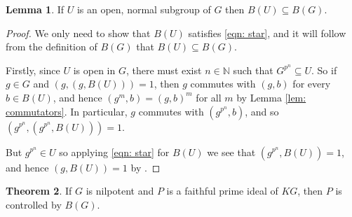 \documentclass[12pt,a4paper]{article}
\theoremstyle{definition}
\newtheorem{thm}{Theorem}[section]
\newtheorem{lem}[thm]{Lemma}
\theoremstyle{remark}
\theoremstyle{custthm}
\begin{document}
\begin{lem}\label{lem: B of open subgroup}
If $U$ is an open, normal subgroup of $G$ then $B(U)\subseteq B(G)$.
\end{lem}

\begin{proof}

We only need to show that $B(U)$ satisfies \eqref{eqn: star}, and it will follow from the definition of $B(G)$ that $B(U)\subseteq B(G)$. 

Firstly, since $U$ is open in $G$, there must exist $n\in\mathbb{N}$ such that $G^{p^n}\subseteq U$. So if $g\in G$ and $(g,(g,B(U)))=1$, then $g$ commutes with $(g,b)$ for every $b\in B(U)$, and hence $(g^m,b) = (g,b)^m$ for all $m$ by Lemma \ref{lem: commutators}. In particular, $g$ commutes with $(g^{p^n},b)$, and so $(g^{p^n},(g^{p^n},B(U))) = 1$.

But $g^{p^n}\in U$ so applying \eqref{eqn: star} for $B(U)$ we see that $(g^{p^n},B(U))=1$, and hence $(g,B(U))=1$ by \cite[Ch. III, 2.1.4]{Laz65}.\end{proof}


\begin{thm}\label{thm: faithful primes are controlled by B}
If $G$ is nilpotent and $P$ is a faithful prime ideal of $KG$, then $P$ is controlled by $B(G)$.
\end{thm}
\end{document}
